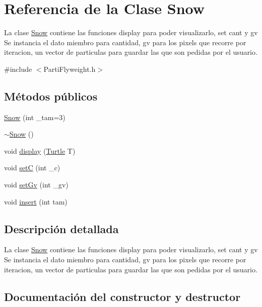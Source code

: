 \hypertarget{classSnow}{}\section{Referencia de la Clase Snow}
\label{classSnow}


La clase \hyperlink{classSnow}{Snow} contiene las funciones display para poder visualizarlo, set cant y gv  Se instancia el dato miembro para cantidad, gv para los pixels que recorre por iteracion, un vector de particulas para guardar las que son pedidas por el usuario.  




{\ttfamily \#include $<$Parti\+Flyweight.\+h$>$}

\subsection*{Métodos públicos}
\begin{DoxyCompactItemize}
\item 
\hyperlink{classSnow_afe2f36ed0e41531355273259e6ad339f}{Snow} (int \+\_\+tam=3)
\item 
\hyperlink{classSnow_a8bf279bbf1ddd5b180692797996ce7b5}{$\sim$\+Snow} ()
\item 
void \hyperlink{classSnow_a624263662e99a3d80022a86be73588f2}{display} (\hyperlink{classTurtle}{Turtle} T)
\item 
void \hyperlink{classSnow_a3cabcbee15d87f551d90be472f1865c4}{setC} (int \+\_\+c)
\item 
void \hyperlink{classSnow_a7b77940da35738cd518c5c66d04350cf}{set\+Gv} (int \+\_\+gv)
\item 
void \hyperlink{classSnow_a441e42b0e5cee4d21220b243e08b344d}{insert} (int tam)
\end{DoxyCompactItemize}


\subsection{Descripción detallada}
La clase \hyperlink{classSnow}{Snow} contiene las funciones display para poder visualizarlo, set cant y gv  Se instancia el dato miembro para cantidad, gv para los pixels que recorre por iteracion, un vector de particulas para guardar las que son pedidas por el usuario. 

\subsection{Documentación del constructor y destructor}
\mbox{\label{classSnow_afe2f36ed0e41531355273259e6ad339f}} 
